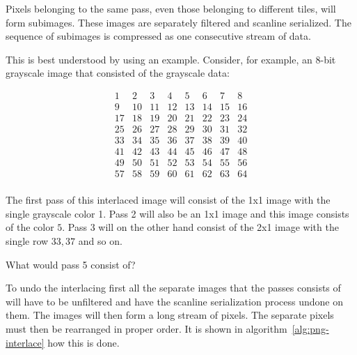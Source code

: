 Pixels belonging to the same pass, even those belonging to different
tiles, will form subimages. These images are separately filtered and
scanline serialized. The sequence of subimages is  compressed
as one consecutive stream of data.

This is best understood by using an example. Consider, for example, an
8-bit grayscale image that consisted of the grayscale data:

\[
\begin{matrix}
  1 & 2 & 3 & 4 & 5 & 6 & 7 & 8\\
  9 & 10 & 11 & 12 & 13 & 14 & 15 & 16\\
  17 & 18 & 19 & 20 & 21 & 22 & 23 & 24\\
  25 & 26 & 27 & 28 & 29 & 30 & 31 & 32\\
  33 & 34 & 35 & 36 & 37 & 38 & 39 & 40\\
  41 & 42 & 43 & 44 & 45 & 46 & 47 & 48\\
  49 & 50 & 51 & 52 & 53 & 54 & 55 & 56\\
  57 & 58 & 59 & 60 & 61 & 62 & 63 & 64\\

\end{matrix}
\]

The first pass of this interlaced image will consist of the 1x1 image
with the single grayscale color 1. Pass 2 will also be an 1x1 image
and this image consists of the color $5$. Pass 3 will on the other
hand consist of the 2x1 image with the single row $33,37$ and so on.

\begin{Exercise}[label={ex-interlace}]

  What would pass 5 consist of?

\end{Exercise}

To undo the interlacing first all the separate images that the passes
consists of will have to be unfiltered and have the scanline
serialization process undone on them. The images will then form a long
stream of pixels. The separate pixels must then be rearranged in
proper order. It is shown in algorithm~\ref{alg:png-interlace} how
this is done.

